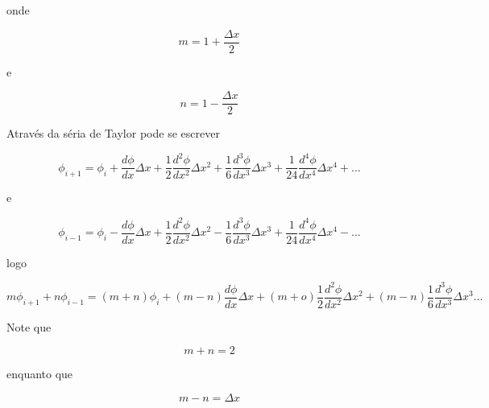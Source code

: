 \documentclass{article}
\begin{document}
        onde
        
        \begin{equation}
            m = 1 + \frac{\Delta x  }{2}
        \end{equation}
        
        e
        
        \begin{equation}
            n = 1 - \frac{\Delta x  }{2}
        \end{equation}

        Através da séria de Taylor pode se escrever

        \begin{equation}
            \phi_{i+1} = \phi_{i}  + \frac{d\phi}{dx} \Delta x  +  \frac{1}{2}\frac{d^2\phi}{dx^2} \Delta x^2  +  \frac{1}{6}\frac{d^3\phi}{dx^3} \Delta x^3 + \frac{1}{24}\frac{d^4\phi}{dx^4} \Delta x^4 + ...
        \end{equation}

        e

        \begin{equation}
            \phi_{i-1} = \phi_{i}  - \frac{d\phi}{dx} \Delta x  +  \frac{1}{2}\frac{d^2\phi}{dx^2} \Delta x^2  -  \frac{1}{6}\frac{d^3\phi}{dx^3} \Delta x^3 + \frac{1}{24}\frac{d^4\phi}{dx^4} \Delta x^4 - ...
        \end{equation}

        logo

        \begin{equation}
            m \phi_{i+1} + n\phi_{i-1}      = (m+n)  \phi_{i}  
                                            + (m-n)               \frac{d\phi}  {dx  } \Delta x 
                                            + (m+o)  \frac{1}{2}  \frac{d^2\phi}{dx^2} \Delta x^2 
                                            + (m-n)  \frac{1}{6}  \frac{d^3\phi}{dx^3} \Delta x^3 
                                             ...
        \end{equation}%

        Note que

        \begin{equation}
            m + n = 2
        \end{equation}

        enquanto que

        \begin{equation}
            m - n = \Delta x
        \end{equation}
\end{document}
